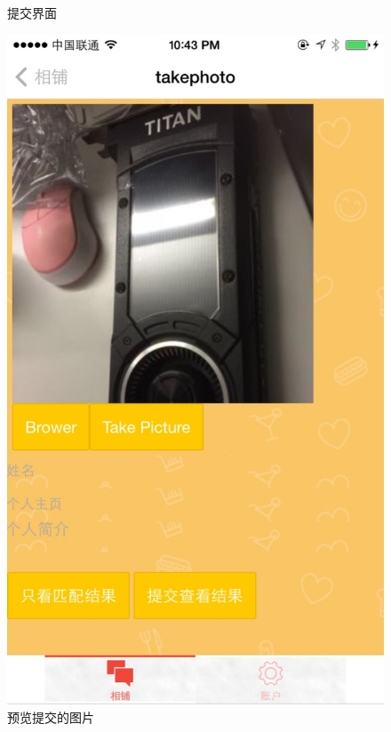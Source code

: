 \begin{figure}[h]
\begin{minipage}[t]{0.3\linewidth}
\caption{提交界面\label{flickr}}
\end{minipage}
\hfill
\begin{minipage}[t]{0.3\linewidth}
\centering
\includegraphics[width=\textwidth]{img/chap4/take2.jpg}
\caption{预览提交的图片\label{instagram}}
\end{minipage}
\hfill
\begin{minipage}[t]{0.3\linewidth}
\centering

\end{minipage}
\end{figure}
